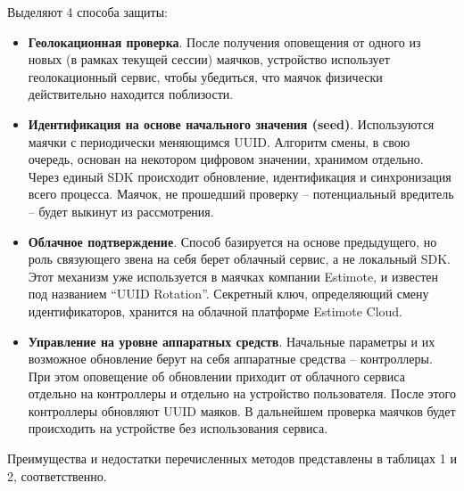 Выделяют 4 способа защиты:

\begin{itemize}
    \item
    \textbf{Геолокационная проверка}. После получения оповещения от одного из новых (в рамках текущей сессии) маячков, устройство использует геолокационный сервис, чтобы убедиться, что маячок физически действительно находится поблизости.
    \item
    \textbf{Идентификация на основе начального значения (seed)}. Используются маячки с периодически меняющимся UUID. Алгоритм смены, в свою очередь, основан на некотором цифровом значении, хранимом отдельно. Через единый SDK происходит обновление, идентификация и синхронизация всего процесса. Маячок, не прошедший проверку – потенциальный вредитель – будет выкинут из рассмотрения.
    \item
    \textbf{Облачное подтверждение}. Способ базируется на основе предыдущего, но роль связующего звена на себя берет облачный сервис, а не локальный SDK. 
Этот механизм уже используется в маячках компании Estimote, и известен под названием “UUID Rotation”. Секретный ключ, определяющий смену идентификаторов, хранится на облачной платформе Estimote Cloud.
    \item
    \textbf{Управление на уровне аппаратных средств}. Начальные параметры и их возможное обновление берут на себя аппаратные средства – контроллеры. При этом оповещение об обновлении приходит от облачного сервиса отдельно на контроллеры и отдельно на устройство пользователя. После этого контроллеры обновляют UUID маяков. В дальнейшем проверка маячков будет происходить на устройстве без использования сервиса.
\end{itemize}

Преимущества и недостатки перечисленных методов представлены в таблицах 1 и 2, соответственно.

